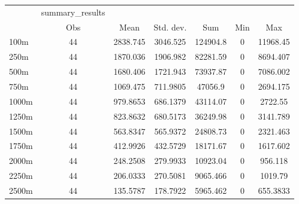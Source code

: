 \begin{tabular}{l*{6}{c}}
\hline\hline
            &summary\_results&            &            &            &            &            \\
            &         Obs&        Mean&   Std. dev.&         Sum&         Min&         Max\\
\hline
100m        &          44&    2838.745&    3046.525&    124904.8&           0&    11968.45\\
250m        &          44&    1870.036&    1906.982&    82281.59&           0&    8694.407\\
500m        &          44&    1680.406&    1721.943&    73937.87&           0&    7086.002\\
750m        &          44&    1069.475&    711.9805&     47056.9&           0&    2694.175\\
1000m       &          44&    979.8653&    686.1379&    43114.07&           0&     2722.55\\
1250m       &          44&    823.8632&    680.5173&    36249.98&           0&    3141.789\\
1500m       &          44&    563.8347&    565.9372&    24808.73&           0&    2321.463\\
1750m       &          44&    412.9926&    432.5729&    18171.67&           0&    1617.602\\
2000m       &          44&    248.2508&    279.9933&    10923.04&           0&     956.118\\
2250m       &          44&    206.0333&    270.5081&    9065.466&           0&     1019.79\\
2500m       &          44&    135.5787&    178.7922&    5965.462&           0&    655.3833\\
\hline\hline
\end{tabular}
